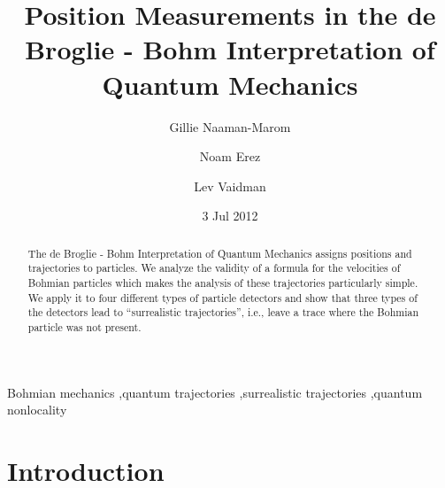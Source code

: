 \documentclass[12pt,preprint,tightenlines]{elsarticle}
\date{3 Jul 2012}
\begin{document}
\begin{frontmatter}

\title{Position Measurements in the de Broglie - Bohm Interpretation of
Quantum Mechanics}

\author{Gillie Naaman-Marom}
\author{Noam Erez}
\author{Lev Vaidman}
\address{Raymond and Beverly Sackler School of Physics and Astronomy\\
 Tel-Aviv University, Tel-Aviv 69978, Israel}


\begin{abstract}
The de Broglie - Bohm Interpretation of Quantum Mechanics assigns positions and
trajectories to particles.
We analyze the validity of a formula for the velocities
 of Bohmian  particles which makes the analysis of these
trajectories particularly simple. We apply it to four different types
of particle detectors and show that three types of the detectors lead
to ``surrealistic trajectories'', i.e., leave a trace where the Bohmian
particle was not present.
\end{abstract}

\begin{keyword}
Bohmian mechanics \sep quantum trajectories \sep surrealistic trajectories \sep quantum nonlocality
\end{keyword}

\end{frontmatter}

\section{ Introduction}

\label{intr}
\end{document}
